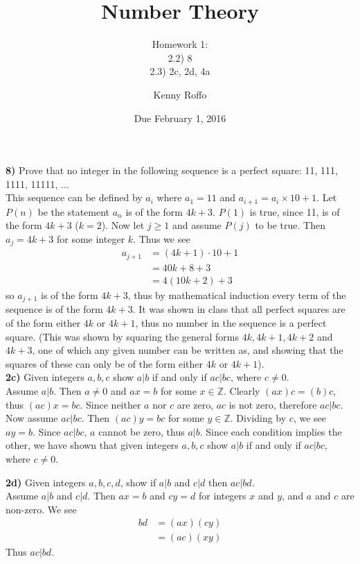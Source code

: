 \documentclass{scrartcl}
\title{Number Theory}
\subtitle{Homework 1:\\2.2) 8\\2.3) 2c, 2d, 4a}
\author{Kenny Roffo}
\date{Due February 1, 2016}
\begin{document}
\maketitle

\textbf{8)} Prove that no integer in the following sequence is a perfect square: 11, 111, 1111, 11111, ...\\

This sequence can be defined by $a_i$ where $a_1=11$ and $a_{i+1}=a_i\times10+1$. Let $P(n)$ be the statement $a_n$ is of the form $4k+3$. $P(1)$ is true, since 11, is of the form $4k+3$ ($k=2$). Now let $j\ge1$ and assume $P(j)$ to be true. Then $a_j = 4k+3$ for some integer $k$. Thus we see
\begin{align*}
  a_{j+1} &= \left(4k+1\right)\cdot10 + 1\\
  &= 40k + 8 + 3\\
  &= 4(10k+2) + 3
\end{align*}
so $a_{j+1}$ is of the form $4k+3$, thus by mathematical induction every term of the sequence is of the form $4k+3$. It was shown in class that all perfect squares are of the form either $4k$ or $4k+1$, thus no number in the sequence is a perfect square. (This was shown by squaring the general forms $4k, 4k+1, 4k+2$ and $4k+3$, one of which any given number can be written as, and showing that the squares of these can only be of the form either $4k$ or $4k+1$).\\

\textbf{2c)} Given integers $a,b,c$ show $a|b$ if and only if $ac|bc$, where $c\ne0$.\\

Assume $a|b$. Then $a\ne0$ and $ax=b$ for some $x\in\mathbb{Z}$. Clearly $(ax)c=(b)c$, thus $(ac)x=bc$. Since neither $a$ nor $c$ are zero, $ac$ is not zero, therefore $ac|bc$.
Now assume $ac|bc$. Then $(ac)y=bc$ for some $y\in\mathbb{Z}$. Dividing by $c$, we see $ay=b$. Since $ac|bc$, $a$ cannot be zero, thus $a|b$.
Since each condition implies the other, we have shown that given integers $a,b,c$ show $a|b$ if and only if $ac|bc$, where $c\ne0$.\pagebreak

\textbf{2d)} Given integers $a,b,c,d$, show if $a|b$ and $c|d$ then $ac|bd$.\\

Assume $a|b$ and $c|d$. Then $ax=b$ and $cy=d$ for integers $x$ and $y$, and $a$ and $c$ are non-zero. We see
\begin{align*}
  bd &= (ax)(cy)\\
  &= (ac)(xy)
\end{align*}
Thus $ac|bd$.\\
\end{document}
